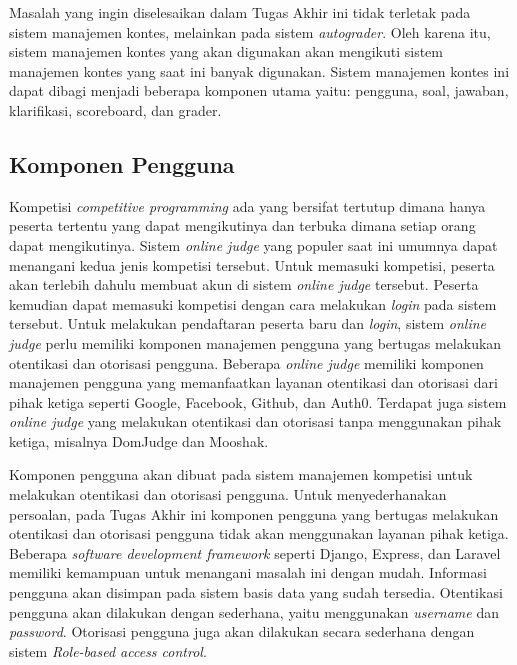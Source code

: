 \par Masalah yang ingin diselesaikan dalam Tugas Akhir ini tidak terletak pada sistem manajemen kontes, melainkan pada sistem \textit{autograder}. Oleh karena itu, sistem manajemen kontes yang akan digunakan akan mengikuti sistem manajemen kontes yang saat ini banyak digunakan. Sistem manajemen kontes ini dapat dibagi menjadi beberapa komponen utama yaitu: pengguna, soal, jawaban, klarifikasi, scoreboard, dan grader.

\subsection{Komponen Pengguna}

\par Kompetisi \textit{competitive programming} ada yang bersifat tertutup dimana hanya peserta tertentu yang dapat mengikutinya dan terbuka dimana setiap orang dapat mengikutinya. Sistem \textit{online judge} yang populer saat ini umumnya dapat menangani kedua jenis kompetisi tersebut. Untuk memasuki kompetisi, peserta akan terlebih dahulu membuat akun di sistem \textit{online judge} tersebut. Peserta kemudian dapat memasuki kompetisi dengan cara melakukan \textit{login} pada sistem tersebut. Untuk melakukan pendaftaran peserta baru dan \textit{login}, sistem \textit{online judge} perlu memiliki komponen manajemen pengguna yang bertugas melakukan otentikasi dan otorisasi pengguna. Beberapa \textit{online judge} memiliki komponen manajemen pengguna yang memanfaatkan layanan otentikasi dan otorisasi dari pihak ketiga seperti Google, Facebook, Github, dan Auth0. Terdapat juga sistem \textit{online judge} yang melakukan otentikasi dan otorisasi tanpa menggunakan pihak ketiga, misalnya DomJudge dan Mooshak.

\par Komponen pengguna akan dibuat pada sistem manajemen kompetisi untuk melakukan otentikasi dan otorisasi pengguna. Untuk menyederhanakan persoalan, pada Tugas Akhir ini komponen pengguna yang bertugas melakukan otentikasi dan otorisasi pengguna tidak akan menggunakan layanan pihak ketiga. Beberapa \textit{software development framework} seperti Django, Express, dan Laravel memiliki kemampuan untuk menangani masalah ini dengan mudah. Informasi pengguna akan disimpan pada sistem basis data yang sudah tersedia. Otentikasi pengguna akan dilakukan dengan sederhana, yaitu menggunakan \textit{username} dan \textit{password}. Otorisasi pengguna juga akan dilakukan secara sederhana dengan sistem \textit{Role-based access control}.


